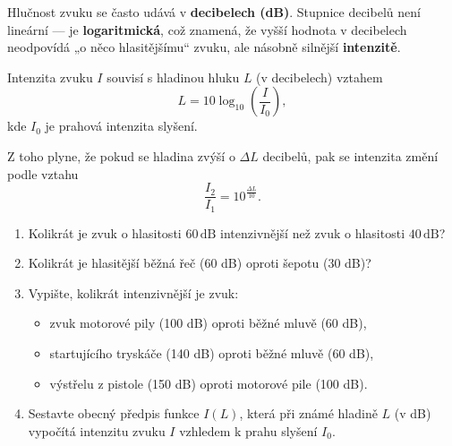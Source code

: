\documentclass[12pt,a4paper]{article}
\begin{document}
\begin{exercise}

Hlučnost zvuku se často udává v \textbf{decibelech (dB)}.
Stupnice decibelů není lineární — je \textbf{logaritmická}, což znamená,
že vyšší hodnota v decibelech neodpovídá „o něco hlasitějšímu“ zvuku,
ale násobně silnější \textbf{intenzitě}.

Intenzita zvuku $I$ souvisí s hladinou hluku $L$ (v decibelech) vztahem
\[
L = 10 \log_{10}\!\left(\frac{I}{I_0}\right),
\]
kde $I_0$ je prahová intenzita slyšení.

Z toho plyne, že pokud se hladina zvýší o $\Delta L$ decibelů,
pak se intenzita změní podle vztahu
\[
\frac{I_2}{I_1} = 10^{\frac{\Delta L}{10}}.
\]

\begin{enumerate}[label=\arabic*.]
    \item Kolikrát je zvuk o hlasitosti $60\,\text{dB}$ intenzivnější než zvuk o hlasitosti $40\,\text{dB}$?
    \item Kolikrát je hlasitější běžná řeč (60 dB) oproti šepotu (30 dB)?
    \item Vypište, kolikrát intenzivnější je zvuk:
    \begin{itemize}
        \item zvuk motorové pily (100 dB) oproti běžné mluvě (60 dB),
        \item startujícího tryskáče (140 dB) oproti běžné mluvě (60 dB),
        \item výstřelu z pistole (150 dB) oproti motorové pile (100 dB).
    \end{itemize}
    \item Sestavte obecný předpis funkce $I(L)$, která při známé hladině $L$ (v dB) vypočítá intenzitu zvuku $I$ vzhledem k prahu slyšení $I_0$.
\end{enumerate}
\end{exercise}
\end{document}
